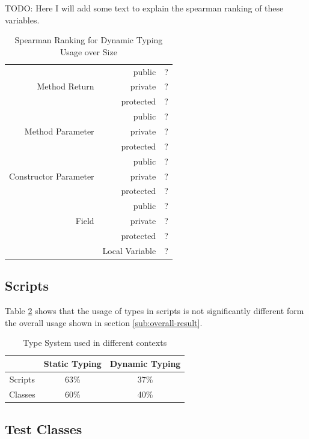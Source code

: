 \documentclass[preprint]{sigplanconf}
\begin{document}
TODO: Here I will add some text to explain the spearman ranking of these variables.

\begin{table}[ht]
\caption{Spearman Ranking for Dynamic Typing Usage over Size}


\centering{}%
\begin{tabular}{|rr|c|}
\hline 
\multirow{3}{*}{Method Return}			& public 			& ?\\
										& private 			& ?\\
										& protected			& ?\\
\hline
\multirow{3}{*}{Method Parameter}		& public 			& ?\\
										& private 			& ?\\
										& protected			& ?\\
\hline
\multirow{3}{*}{Constructor Parameter}	& public			& ?\\
										& private 			& ?\\
										& protected			& ?\\
\hline
\multirow{3}{*}{Field}					& public 			& ?\\
										& private 			& ?\\
										& protected			& ?\\
\hline
										& Local Variable	& ?\\
\hline  	
\end{tabular}
\label{tab:size_dynamic_spearman}
\end{table}



\subsection{Scripts\label{sub:scripts}}
Table \ref{tab:scritps} shows that the usage of types in scripts is not significantly different form the overall usage shown in section \ref{sub:overall-result}.

\begin{table}[ht]
\caption{Type System used in different contexts}


\centering{}%
\begin{tabular}{|c|c|c|}
\hline 
 & Static Typing & Dynamic Typing\tabularnewline
\hline 
\hline 
Scripts & 63\% & 37\%\tabularnewline
\hline 
Classes & 60\% & 40\%\tabularnewline
\hline 
\end{tabular}
\label{tab:scritps}
\end{table}


\subsection{Test Classes\label{sub:scripts}}
\end{document}
